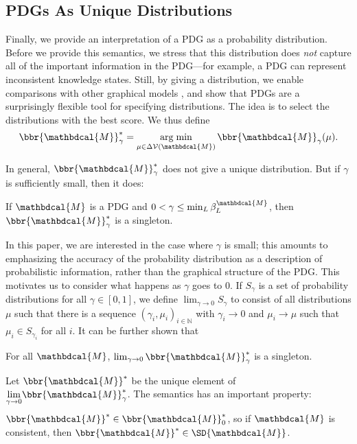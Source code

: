 \documentclass[letterpaper]{article} %
\theoremstyle{plain}
\theoremstyle{definition}
\theoremstyle{remark}
\newcommand{\begthm}[3][]{\begin{#2}[{name=#1},restate=#3,label=#3]}
\DeclareMathOperator*{\argmin}{arg\;min}
\newcommand{\V}{\mathcal V}
\newcommand{\dg}[1]{\mathbdcal{#1}}
\begin{document}
\subsection{PDGs As Unique Distributions}\label{sec:uniq-dist-semantics}

Finally, we provide an interpretation of a PDG as a probability distribution.
Before we provide this semantics, we stress that this distribution does
\emph{not} capture all of the important information in the PDG---for example, a
PDG can represent inconsistent knowledge states.  Still, by giving a
distribution, we enable comparisons with other graphical models%
, and show that PDGs are
a surprisingly flexible tool for specifying distributions.  
The idea is to select the distributions with the best score. 
We thus define 
\begin{equation}
	\bbr{\dg M}_\gamma^* = \argmin_{\mu \in \Delta\V(\dg M)} \bbr{\dg M}_\gamma(\mu).
\end{equation}   

In general, $\bbr{\dg M}_\gamma^*$ does not give a unique distribution.  But if
$\gamma$ is sufficiently small, then it does:

\begthm{prop}{prop:sem3}
	If $\dg M$ is a PDG and $0 < \gamma \leq \min_L \beta_L^{\dg M}$, then
	$\bbr{\dg M}_\gamma^*$ is a singleton. 
\end{prop}

In this paper, we are interested in the case where $\gamma$ is small;
this amounts to emphasizing the accuracy of the probability
distribution as a description of probabilistic information,
rather than the graphical structure of the PDG.  
This motivates us to consider
what happens as $\gamma$ goes to 0.  If $S_\gamma$ is a set of
probability distributions for all $\gamma \in [0,1]$, we define $\lim_{\gamma
\rightarrow 0} S_\gamma$ to consist of all distributions $\mu$ such that there
is a sequence $(\gamma_i, \mu_i)_{i \in \mathbb N}$ with $\gamma_i \to 0$ and
$\mu_i \to \mu$ such that $\mu_i \in S_{\gamma_i}$ for all $i$. 
It can be further shown that 

\begthm{prop}{prop:limit-uniq}
    For all $\dg M$, $\lim_{\gamma\to0}\bbr{\dg M}_\gamma^*$ is a singleton.
\end{prop}
Let $\bbr{{\dg M}}^*$ be the unique element of $\smash{\lim\limits_{\gamma
	\rightarrow 0}} \bbr{{\dg M}}_\gamma^*$. 
The semantics has an important property: 

\begthm{prop}{prop:consist}
	$\bbr{\dg M}^* \in \bbr{\dg M}_0^*$, so if $\dg M$ is consistent,
	then $\bbr{\dg M}^* \in \SD{\dg  M}$.
\end{prop}
\end{document}
